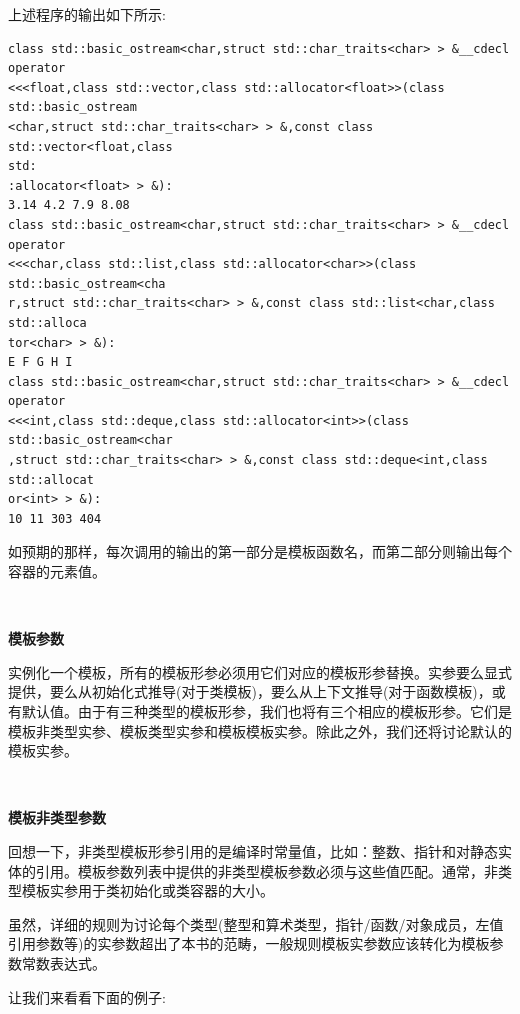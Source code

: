 上述程序的输出如下所示:

\begin{lstlisting}[caption={}]
class std::basic_ostream<char,struct std::char_traits<char> > &__cdecl
operator
<<<float,class std::vector,class std::allocator<float>>(class
std::basic_ostream
<char,struct std::char_traits<char> > &,const class std::vector<float,class
std:
:allocator<float> > &):
3.14 4.2 7.9 8.08
class std::basic_ostream<char,struct std::char_traits<char> > &__cdecl
operator
<<<char,class std::list,class std::allocator<char>>(class
std::basic_ostream<cha
r,struct std::char_traits<char> > &,const class std::list<char,class
std::alloca
tor<char> > &):
E F G H I
class std::basic_ostream<char,struct std::char_traits<char> > &__cdecl
operator
<<<int,class std::deque,class std::allocator<int>>(class
std::basic_ostream<char
,struct std::char_traits<char> > &,const class std::deque<int,class
std::allocat
or<int> > &):
10 11 303 404	
\end{lstlisting}

如预期的那样，每次调用的输出的第一部分是模板函数名，而第二部分则输出每个容器的元素值。 \par

\noindent\textbf{}\ \par
\textbf{模板参数} \ \par
实例化一个模板，所有的模板形参必须用它们对应的模板形参替换。实参要么显式提供，要么从初始化式推导(对于类模板)，要么从上下文推导(对于函数模板)，或有默认值。由于有三种类型的模板形参，我们也将有三个相应的模板形参。它们是模板非类型实参、模板类型实参和模板模板实参。除此之外，我们还将讨论默认的模板实参。 \par

\noindent\textbf{}\ \par
\textbf{模板非类型参数} \ \par
回想一下，非类型模板形参引用的是编译时常量值，比如：整数、指针和对静态实体的引用。模板参数列表中提供的非类型模板参数必须与这些值匹配。通常，非类型模板实参用于类初始化或类容器的大小。 \par
虽然，详细的规则为讨论每个类型(整型和算术类型，指针/函数/对象成员，左值引用参数等)的实参数超出了本书的范畴，一般规则模板实参数应该转化为模板参数常数表达式。 \par
让我们来看看下面的例子: \par

